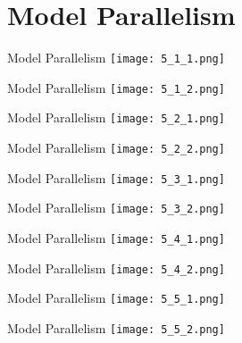 \documentclass[t]{beamer}
\begin{document}
\section{Model Parallelism}

\begin{frame}{Model Parallelism}
\texttt{[image: 5\_1\_1.png]}
\end{frame}

\begin{frame}{Model Parallelism}
\texttt{[image: 5\_1\_2.png]}
\end{frame}

\begin{frame}{Model Parallelism}
\texttt{[image: 5\_2\_1.png]}
\end{frame}

\begin{frame}{Model Parallelism}
\texttt{[image: 5\_2\_2.png]}
\end{frame}

\begin{frame}{Model Parallelism}
\texttt{[image: 5\_3\_1.png]}
\end{frame}

\begin{frame}{Model Parallelism}
\texttt{[image: 5\_3\_2.png]}
\end{frame}

\begin{frame}{Model Parallelism}
\texttt{[image: 5\_4\_1.png]}
\end{frame}

\begin{frame}{Model Parallelism}
\texttt{[image: 5\_4\_2.png]}
\end{frame}

\begin{frame}{Model Parallelism}
\texttt{[image: 5\_5\_1.png]}
\end{frame}

\begin{frame}{Model Parallelism}
\texttt{[image: 5\_5\_2.png]}
\end{frame}
\end{document}
